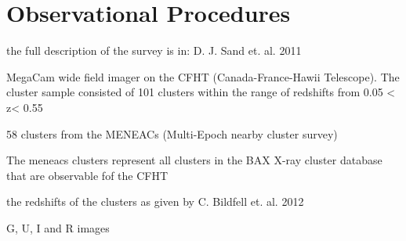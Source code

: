 
\chapter{Observational Procedures}

the full description of the survey is in: D. J. Sand et. al. 2011

MegaCam wide field imager on the CFHT (Canada-France-Hawii Telescope). The cluster sample consisted of 101 clusters within the range of redshifts from 0.05 < z< 0.55

58 clusters from the MENEACs (Multi-Epoch nearby cluster survey)

The meneacs clusters represent all clusters in the BAX X-ray cluster database that are observable fof the CFHT

the redshifts of the clusters as given by C. Bildfell et. al. 2012 

G, U, I and R images


